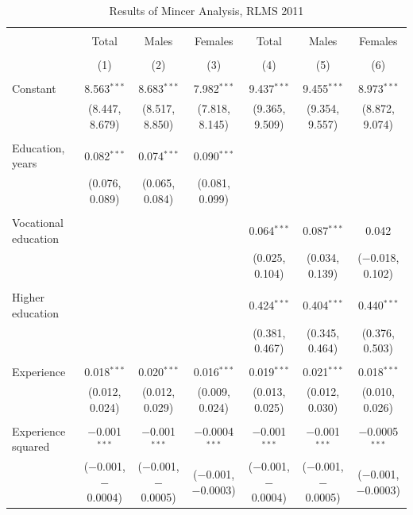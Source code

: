 \documentclass[12pt,a4paper]{article}
\numberwithin{equation}{section}
\begin{document}
\begin{landscape}
	
	\fontsize{9}{11}
	\selectfont
	
	\begin{table}[!htbp] \centering 
		\caption{Results of Mincer Analysis, RLMS 2011} 
		\label{} 
		\begin{tabular}{@{\extracolsep{5pt}}lcccccc} 
			\\[-1.8ex]\hline 
			\hline \\[-1.8ex] 
			& Total & Males & Females & Total & Males & Females \\ 
			\\[-1.8ex] & (1) & (2) & (3) & (4) & (5) & (6)\\ 
			\hline \\[-1.8ex] 
			Constant & 8.563$^{***}$ & 8.683$^{***}$ & 7.982$^{***}$ & 9.437$^{***}$ & 9.455$^{***}$ & 8.973$^{***}$ \\ 
			& (8.447, 8.679) & (8.517, 8.850) & (7.818, 8.145) & (9.365, 9.509) & (9.354, 9.557) & (8.872, 9.074) \\ 
			& & & & & & \\ 
			Education, years & 0.082$^{***}$ & 0.074$^{***}$ & 0.090$^{***}$ &  &  &  \\ 
			& (0.076, 0.089) & (0.065, 0.084) & (0.081, 0.099) &  &  &  \\ 
			& & & & & & \\ 
			Vocational education &  &  &  & 0.064$^{***}$ & 0.087$^{***}$ & 0.042 \\ 
			&  &  &  & (0.025, 0.104) & (0.034, 0.139) & ($-$0.018, 0.102) \\ 
			& & & & & & \\ 
			Higher education &  &  &  & 0.424$^{***}$ & 0.404$^{***}$ & 0.440$^{***}$ \\ 
			&  &  &  & (0.381, 0.467) & (0.345, 0.464) & (0.376, 0.503) \\ 
			& & & & & & \\ 
			Experience & 0.018$^{***}$ & 0.020$^{***}$ & 0.016$^{***}$ & 0.019$^{***}$ & 0.021$^{***}$ & 0.018$^{***}$ \\ 
			& (0.012, 0.024) & (0.012, 0.029) & (0.009, 0.024) & (0.013, 0.025) & (0.012, 0.030) & (0.010, 0.026) \\ 
			& & & & & & \\ 
			Experience squared & $-$0.001$^{***}$ & $-$0.001$^{***}$ & $-$0.0004$^{***}$ & $-$0.001$^{***}$ & $-$0.001$^{***}$ & $-$0.0005$^{***}$ \\ 
			& ($-$0.001, $-$0.0004) & ($-$0.001, $-$0.0005) & ($-$0.001, $-$0.0003) & ($-$0.001, $-$0.0004) & ($-$0.001, $-$0.0005) & ($-$0.001, $-$0.0003) \\ 

\end{tabular}
\end{table}
\end{landscape}
\end{document}
